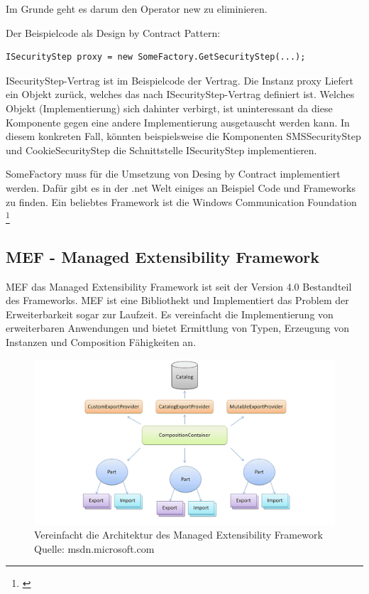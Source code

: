 Im Grunde geht es darum den Operator new zu eliminieren.

Der Beispielcode als Design by Contract Pattern:

\begin{verbatim}
ISecurityStep proxy = new SomeFactory.GetSecurityStep(...);
\end{verbatim}

ISecurityStep-Vertrag ist im Beispielcode der Vertrag. Die Instanz proxy
Liefert ein Objekt zurück, welches das nach ISecurityStep-Vertrag
definiert ist. Welches Objekt (Implementierung) sich dahinter verbirgt,
ist uninteressant da diese Komponente gegen eine andere Implementierung
ausgetauscht werden kann. In diesem konkreten Fall, könnten
beispielsweise die Komponenten SMSSecurityStep und CookieSecurityStep
die Schnittstelle ISecurityStep implementieren.

SomeFactory muss für die Umsetzung von Desing by Contract implementiert
werden. Dafür gibt es in der .net Welt einiges an Beispiel Code und
Frameworks zu finden. Ein beliebtes Framework ist die Windows
Communication Foundation \footnote{\autocite{design-By-Contract}}

\subsection{MEF - Managed Extensibility
Framework}\label{mef---managed-extensibility-framework}

MEF das Managed Extensibility Framework ist seit der Version 4.0
Bestandteil des Frameworks. MEF ist eine Bibliothekt und Implementiert
das Problem der Erweiterbarkeit sogar zur Laufzeit. Es vereinfacht die
Implementierung von erweiterbaren Anwendungen und bietet Ermittlung von
Typen, Erzeugung von Instanzen und Composition Fähigkeiten an.

\begin{figure}[htbp]
\centering
\includegraphics{images/mef_architektur.jpg}
\caption{Vereinfacht die Architektur des Managed Extensibility Framework
Quelle: msdn.microsoft.com}
\end{figure}

